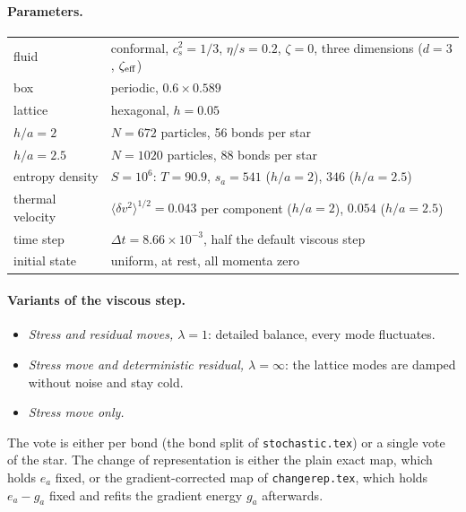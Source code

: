 \documentclass[11pt,aps,preprint,nofootinbib,superscriptaddress,tightenlines]{revtex4-2}
\newcommand{\avg}[1]{\langle #1\rangle}
\let\oldparagraph\paragraph
\renewcommand{\paragraph}{\par\bigskip\oldparagraph}
\begin{document}
\paragraph{Parameters.}
\begin{center}
\begin{tabular}{ll}
\hline
fluid & conformal, $c_s^2=1/3$, $\eta/s=0.2$, $\zeta=0$, three dimensions ($d=3$, $\zeta_{\rm eff}$) \\
box & periodic, $0.6\times0.589$ \\
lattice & hexagonal, $h=0.05$ \\
$h/a=2$ & $N=672$ particles, 56 bonds per star \\
$h/a=2.5$ & $N=1020$ particles, 88 bonds per star \\
entropy density & $S=10^6$: $T=90.9$, $s_a=541$ ($h/a=2$), $346$ ($h/a=2.5$) \\
thermal velocity & $\avg{\delta v^2}^{1/2}=0.043$ per component ($h/a=2$), $0.054$ ($h/a=2.5$) \\
time step & $\Delta t=8.66\times10^{-3}$, half the default viscous step \\
initial state & uniform, at rest, all momenta zero \\
\hline
\end{tabular}
\end{center}

\paragraph{Variants of the viscous step.}
\begin{itemize}
\item \emph{Stress and residual moves, $\lambda=1$}: detailed balance, every mode
  fluctuates.
\item \emph{Stress move and deterministic residual, $\lambda=\infty$}: the lattice
  modes are damped without noise and stay cold.
\item \emph{Stress move only.}
\end{itemize}
The vote is either per bond (the bond split of \texttt{stochastic.tex}) or a single
vote of the star.  The change of representation is either the plain exact map,
which holds $e_a$ fixed, or the gradient-corrected map of \texttt{changerep.tex},
which holds $e_a-g_a$ fixed and refits the gradient energy $g_a$ afterwards.
\end{document}
